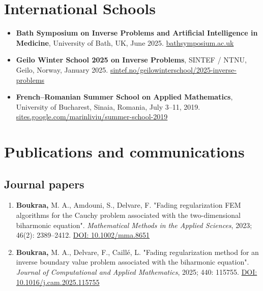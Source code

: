 \documentclass[10pt]{article} %
\begin{document}
\section*{International Schools}

\begin{itemize}

  \item \textbf{Bath Symposium on Inverse Problems and Artificial Intelligence in Medicine},  
  University of Bath, UK, June 2025.  
  \href{https://bathsymposium.ac.uk/symposium/inverse-problems-and-artificial-intelligence-in-medicine/}{bathsymposium.ac.uk}

  \item \textbf{Geilo Winter School 2025 on Inverse Problems},  
  SINTEF / NTNU, Geilo, Norway, January 2025.  
  \href{https://www.sintef.no/projectweb/geilowinterschool/2025-inverse-problems/}{sintef.no/geilowinterschool/2025-inverse-problems}


  \item \textbf{French–Romanian Summer School on Applied Mathematics},  
  University of Bucharest, Sinaia, Romania, July 3–11, 2019.  
  \href{https://sites.google.com/site/marinliviu/french-romanian-summer-school-on-applied-mathematics/6th-french-romanian-summer-school-on-applied-mathematics-3-11-july-2019}{sites.google.com/marinliviu/summer-school-2019}
\end{itemize}

\section{Publications and communications}
\subsection{Journal papers}

\begin{enumerate}
  \item \textbf{Boukraa,} M. A., Amdouni, S., Delvare, F.  
  "Fading regularization FEM algorithms for the Cauchy problem associated with the two-dimensional biharmonic equation".  
  \textit{Mathematical Methods in the Applied Sciences}, 2023; 46(2): 2389–2412.  
  \href{https://doi.org/10.1002/mma.8651}{DOI: 10.1002/mma.8651}

  \item \textbf{Boukraa,} M. A., Delvare, F., Caillé, L.  
  "Fading regularization method for an inverse boundary value problem associated with the biharmonic equation".  
  \textit{Journal of Computational and Applied Mathematics}, 2025; 440: 115755.  
  \href{https://doi.org/10.1016/j.cam.2025.115755}{DOI: 10.1016/j.cam.2025.115755}
\end{enumerate}
\end{document}
